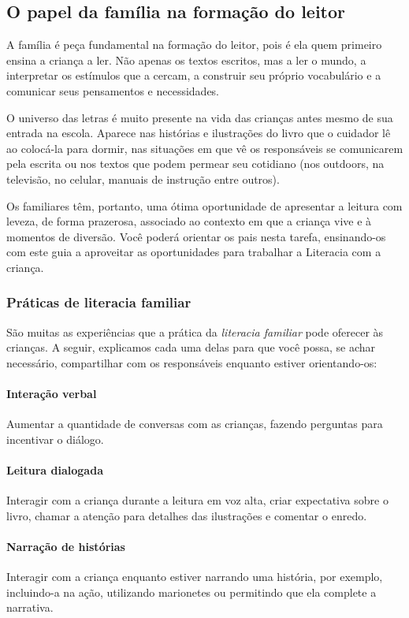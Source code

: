\documentclass[11pt]{extarticle}
\begin{document}
\subsection{O papel da família na formação do leitor}
A família é peça fundamental na formação do leitor, pois é ela quem primeiro 
ensina a criança a ler. Não apenas os textos escritos, mas a ler o mundo, a 
interpretar os estímulos que a cercam, a construir seu próprio vocabulário e a 
comunicar seus pensamentos e necessidades.

O universo das letras é muito presente na vida das crianças antes mesmo de sua 
entrada na escola. Aparece nas histórias e ilustrações do livro que o cuidador 
lê ao colocá-la para dormir, nas situações em que vê os responsáveis se comunicarem 
pela escrita ou nos textos que podem permear seu cotidiano (nos outdoors, na 
televisão, no celular, manuais de instrução entre outros). 

Os familiares têm, 
portanto, uma ótima oportunidade de apresentar a leitura com leveza, de forma 
prazerosa, associado ao contexto em que a criança vive e à momentos de diversão. 
Você poderá orientar os pais nesta tarefa, ensinando-os com este guia a aproveitar 
as oportunidades para trabalhar a Literacia com a criança.


\subsubsection{Práticas de literacia familiar} 

São muitas as experiências que a prática da \textit{literacia familiar} 
pode oferecer às crianças. A seguir, explicamos cada uma delas para que você possa, 
se achar necessário, compartilhar com os responsáveis enquanto estiver orientando-os: 

\paragraph{Interação verbal} Aumentar a quantidade de conversas com as 
crianças, fazendo perguntas para incentivar o diálogo.

\paragraph{Leitura dialogada} Interagir com a criança durante a leitura 
em voz alta, criar expectativa sobre o livro, chamar a atenção para detalhes 
das ilustrações e comentar o enredo.

\paragraph{Narração de histórias} Interagir com a criança enquanto 
estiver narrando uma história, por exemplo, incluindo-a na ação, utilizando 
marionetes ou permitindo que ela complete a narrativa.
\end{document}
